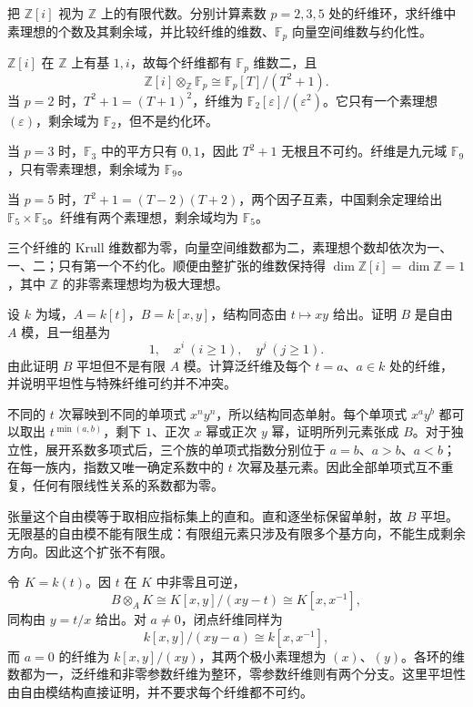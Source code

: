 \begin{exercise}\label{g5:ex:gaussian-prime-fibers}
	把 \(\mathbb Z[i]\) 视为 \(\mathbb Z\) 上的有限代数。分别计算素数 \(p=2,3,5\) 处的纤维环，求纤维中素理想的个数及其剩余域，并比较纤维的维数、\(\mathbb F_p\) 向量空间维数与约化性。
\end{exercise}
\begin{solution}
	\(\mathbb Z[i]\) 在 \(\mathbb Z\) 上有基 \(1,i\)，故每个纤维都有 \(\mathbb F_p\) 维数二，且
	\[
		\mathbb Z[i]\otimes_{\mathbb Z}\mathbb F_p
		\cong\mathbb F_p[T]/(T^2+1).
	\]
	当 \(p=2\) 时，\(T^2+1=(T+1)^2\)，纤维为
	\(\mathbb F_2[\varepsilon]/(\varepsilon^2)\)。它只有一个素理想 \((\varepsilon)\)，剩余域为 \(\mathbb F_2\)，但不是约化环。

	当 \(p=3\) 时，\(\mathbb F_3\) 中的平方只有 \(0,1\)，因此 \(T^2+1\) 无根且不可约。纤维是九元域 \(\mathbb F_9\)，只有零素理想，剩余域为 \(\mathbb F_9\)。

	当 \(p=5\) 时，\(T^2+1=(T-2)(T+2)\)，两个因子互素，中国剩余定理给出 \(\mathbb F_5\times\mathbb F_5\)。纤维有两个素理想，剩余域均为 \(\mathbb F_5\)。

	三个纤维的 Krull 维数都为零，向量空间维数都为二，素理想个数却依次为一、一、二；只有第一个不约化。顺便由整扩张的维数保持得 \(\dim\mathbb Z[i]=\dim\mathbb Z=1\)，其中 \(\mathbb Z\) 的非零素理想均为极大理想。
\end{solution}

\begin{exercise}\label{g5:ex:flat-hyperbola-family}
	设 \(k\) 为域，\(A=k[t]\)，\(B=k[x,y]\)，结构同态由 \(t\mapsto xy\) 给出。证明 \(B\) 是自由 \(A\) 模，且一组基为
	\[
		1,\quad x^i\ (i\geq1),\quad y^j\ (j\geq1).
	\]
	由此证明 \(B\) 平坦但不是有限 \(A\) 模。计算泛纤维及每个 \(t=a\)、\(a\in k\) 处的纤维，并说明平坦性与特殊纤维可约并不冲突。
\end{exercise}
\begin{solution}
	不同的 \(t\) 次幂映到不同的单项式 \(x^ny^n\)，所以结构同态单射。每个单项式 \(x^ay^b\) 都可以取出 \(t^{\min(a,b)}\)，剩下 \(1\)、正次 \(x\) 幂或正次 \(y\) 幂，证明所列元素张成 \(B\)。对于独立性，展开系数多项式后，三个族的单项式指数分别位于 \(a=b\)、\(a>b\)、\(a<b\)；在每一族内，指数又唯一确定系数中的 \(t\) 次幂及基元素。因此全部单项式互不重复，任何有限线性关系的系数都为零。

	张量这个自由模等于取相应指标集上的直和。直和逐坐标保留单射，故 \(B\) 平坦。无限基的自由模不能有限生成：有限组元素只涉及有限多个基方向，不能生成剩余方向。因此这个扩张不有限。

	令 \(K=k(t)\)。因 \(t\) 在 \(K\) 中非零且可逆，
	\[
		B\otimes_AK\cong K[x,y]/(xy-t)\cong K[x,x^{-1}],
	\]
	同构由 \(y=t/x\) 给出。对 \(a\ne0\)，闭点纤维同样为
	\[
		k[x,y]/(xy-a)\cong k[x,x^{-1}],
	\]
	而 \(a=0\) 的纤维为 \(k[x,y]/(xy)\)，其两个极小素理想为 \((x)\)、\((y)\)。各环的维数都为一，泛纤维和非零参数纤维为整环，零参数纤维则有两个分支。这里平坦性由自由模结构直接证明，并不要求每个纤维都不可约。
\end{solution}

